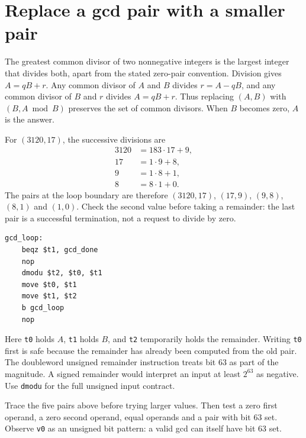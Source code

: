 \section{Replace a gcd pair with a smaller pair}
The greatest common divisor of two nonnegative integers is the largest integer that
divides both, apart from the stated zero-pair convention. Division gives
\(A=qB+r\). Any common divisor of \(A\) and \(B\) divides \(r=A-qB\), and any common
divisor of \(B\) and \(r\) divides \(A=qB+r\). Thus replacing \((A,B)\) with
\((B,A\bmod B)\) preserves the set of common divisors. When \(B\) becomes zero,
\(A\) is the answer.

For \((3120,17)\), the successive divisions are
\[
\begin{aligned}
3120&=183\cdot17+9,\\
17&=1\cdot9+8,\\
9&=1\cdot8+1,\\
8&=8\cdot1+0.
\end{aligned}
\]
The pairs at the loop boundary are therefore \((3120,17)\), \((17,9)\), \((9,8)\),
\((8,1)\) and \((1,0)\). Check the second value before taking a remainder: the
last pair is a successful termination, not a request to divide by zero.

\begin{verbatim}
gcd_loop:
    beqz $t1, gcd_done
    nop
    dmodu $t2, $t0, $t1
    move $t0, $t1
    move $t1, $t2
    b gcd_loop
    nop
\end{verbatim}

Here \texttt{t0} holds \(A\), \texttt{t1} holds \(B\), and \texttt{t2} temporarily
holds the remainder. Writing \texttt{t0} first is safe because the remainder has already
been computed from the old pair. The doubleword unsigned remainder instruction treats
bit 63 as part of the magnitude. A signed remainder would interpret an input at least
\(2^{63}\) as negative. Use \texttt{dmodu} for the full unsigned input contract.

Trace the five pairs above before trying larger values. Then test a zero first
operand, a zero second operand, equal operands and a pair with bit 63 set. Observe
\texttt{v0} as an unsigned bit pattern: a valid gcd can itself have bit 63 set.
